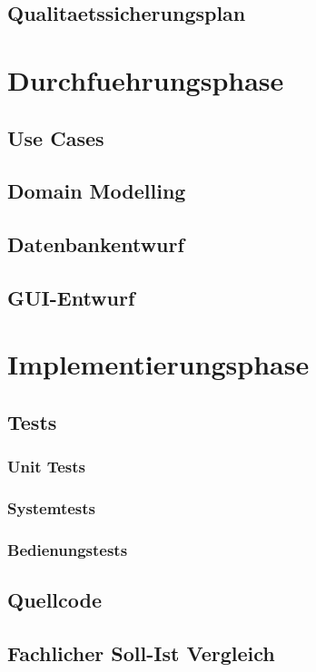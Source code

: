 \documentclass[11pt, a4paper]{article}
\begin{document}
    \subsection{Qualitaetssicherungsplan}
    \newpage

  \section{Durchfuehrungsphase}
    \subsection{Use Cases}
    \subsection{Domain Modelling}
    \subsection{Datenbankentwurf}
    \subsection{GUI-Entwurf}
    \newpage

  \section{Implementierungsphase}
    \subsection{Tests}
      \subsubsection{Unit Tests}
      \subsubsection{Systemtests}
      \subsubsection{Bedienungstests}
    \subsection{Quellcode}
    \subsection{Fachlicher Soll-Ist Vergleich}
\end{document}
